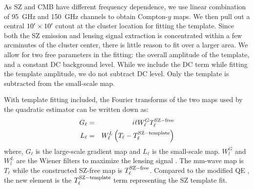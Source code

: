 As SZ and CMB have different frequency dependence, we use linear combination of 95\, GHz and 150\, GHz channels to obtain Compton-$y$ maps.
We then pull out a central $10^{\prime} \times 10^{\prime}$ cutout at the cluster location for fitting the template. 
Since both the SZ emission and lensing signal extraction is concentrated within a few arcminutes of the cluster center, there is little reason to fit over a larger area. 
We allow for two free parameters in the fitting: the overall amplitude of the template, and a constant DC background level. 
While we include the DC term while fitting the template amplitude, we do not subtract DC level. 
Only the template is subtracted from the small-scale map.



With template fitting included, the Fourier transforms of the two maps used by the quadratic estimator can be written down as:
\begin{eqnarray}
G_{\ell} &=& i\ell W^{G}_{\ell} T^{\rm SZ-free}_{\ell}\\
L_{\ell} &=& W^{L}_{\ell} \left(T_{\ell} - T_\ell^{\rm SZ-template}\right)
\end{eqnarray}
where, $G_{\ell}$ is the large-scale gradient map and $L_{\ell}$ is the small-scale map. 
$W^{G}_{l}$ and $W^{L}_{l} $ are the Wiener filters to maximize the lensing signal \cite{hu07}. 
The mm-wave map is $T_{\ell}$ while the constructed SZ-free map is $T^{\rm SZ-free}_{\ell}$. 
Compared to the modified QE \citep{madhavacheril18,raghunathan18}, the new element is the $T_\ell^{\rm SZ-template}$ term representing the SZ template fit. 




